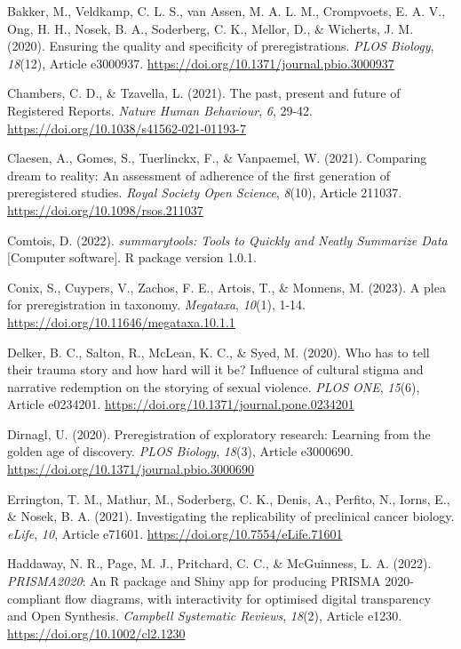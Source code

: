 \documentclass[authordate, empirical]{jote-new-article}
\begin{document}
	\indent Bakker, M., Veldkamp, C. L. S., van Assen, M. A. L. M., Crompvoets, E. A. V., Ong, H. H., Nosek, B. A., Soderberg, C. K., Mellor, D., \& Wicherts, J. M. (2020). Ensuring the quality and specificity of preregistrations. \emph{PLOS Biology}, \emph{18}(12), Article e3000937. \url{https://doi.org/10.1371/journal.pbio.3000937}



	Chambers, C. D., \& Tzavella, L. (2021). The past, present and future of Registered Reports. \emph{Nature Human Behaviour}, \emph{6}, 29-42. \url{https://doi.org/10.1038/s41562-021-01193-7}



	Claesen, A., Gomes, S., Tuerlinckx, F., \& Vanpaemel, W. (2021). Comparing dream to reality: An assessment of adherence of the first generation of preregistered studies. \emph{Royal Society Open Science}, \emph{8}(10), Article 211037. \url{https://doi.org/10.1098/rsos.211037}



	Comtois, D. (2022). \emph{summarytools: Tools to Quickly and Neatly Summarize Data} [Computer software]. R package version 1.0.1.



	Conix, S., Cuypers, V., Zachos, F. E., Artois, T., \& Monnens, M. (2023). A plea for preregistration in taxonomy. \emph{Megataxa}, \emph{10}(1), 1-14. \url{https://doi.org/10.11646/megataxa.10.1.1}



	Delker, B. C., Salton, R., McLean, K. C., \& Syed, M. (2020). Who has to tell their trauma story and how hard will it be? Influence of cultural stigma and narrative redemption on the storying of sexual violence. \emph{PLOS ONE}, \emph{15}(6), Article e0234201. \url{https://doi.org/10.1371/journal.pone.0234201}



	Dirnagl, U. (2020). Preregistration of exploratory research: Learning from the golden age of discovery. \emph{PLOS Biology}, \emph{18}(3), Article e3000690. \url{https://doi.org/10.1371/journal.pbio.3000690}



	Errington, T. M., Mathur, M., Soderberg, C. K., Denis, A., Perfito, N., Iorns, E., \& Nosek, B. A. (2021). Investigating the replicability of preclinical cancer biology. \emph{eLife}, \emph{10}, Article e71601. \url{https://doi.org/10.7554/eLife.71601}



	Haddaway, N. R., Page, M. J., Pritchard, C. C., \& McGuinness, L. A. (2022). \emph{PRISMA2020}: An R package and Shiny app for producing PRISMA 2020-compliant flow diagrams, with interactivity for optimised digital transparency and Open Synthesis. \emph{Campbell Systematic Reviews}, \emph{18}(2), Article e1230. \url{https://doi.org/10.1002/cl2.1230}
\end{document}
